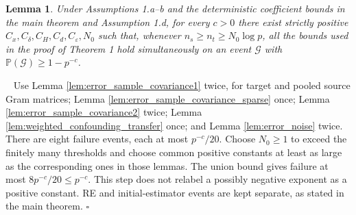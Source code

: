 \documentclass[12pt]{article}
\newtheorem{lemma}{Lemma}
\newenvironment{pf}{{\noindent \it Proof}\ }{\hfill $\square$\par}
\begin{document}
\begin{lemma}
\label{lem:high_probability_set}
Under Assumptions 1.a--b and the deterministic coefficient bounds in the
main theorem and Assumption 1.d, for every $c>0$ there exist strictly
positive $C_x,C_\delta,C_H,C_d,C_\varepsilon,N_0$ such that, whenever
$n_s\ge n_t\ge N_0\log p$, all the bounds used in the proof of Theorem 1
hold simultaneously on an event $\mathcal G$ with
$\mathbb P(\mathcal G)\ge1-p^{-c}$.
\end{lemma}
\begin{pf}
Use Lemma \ref{lem:error_sample_covariance1} twice, for target and pooled
source Gram matrices; Lemma \ref{lem:error_sample_covariance_sparse} once;
Lemma \ref{lem:error_sample_covariance2} twice; Lemma
\ref{lem:weighted_confounding_transfer} once; and Lemma
\ref{lem:error_noise} twice. There are eight failure events, each at most
$p^{-c}/20$. Choose $N_0\ge1$ to exceed the finitely many thresholds and
choose common positive constants at least as large as the corresponding
ones in those lemmas. The union bound gives failure at most
$8p^{-c}/20\le p^{-c}$. This step does not relabel a possibly negative
exponent as a positive constant. RE and initial-estimator events are kept
separate, as stated in the main theorem.
\end{pf}
\end{document}
